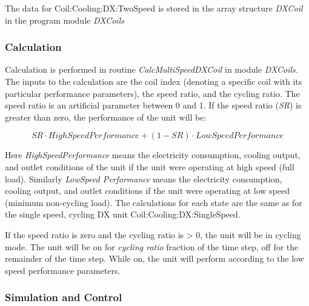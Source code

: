 The data for Coil:Cooling:DX:TwoSpeed is stored in the array structure \emph{DXCoil} in the program module \emph{DXCoils}

\subsubsection{Calculation}\label{calculation-000}

Calculation is performed in routine \emph{CalcMultiSpeedDXCoil} in module \emph{DXCoils}. The inputs to the calculation are the coil index (denoting a specific coil with its particular performance parameters), the speed ratio, and the cycling ratio. The speed ratio is an artificial parameter between 0 and 1. If the speed ratio (\emph{SR}) is greater than zero, the performance of the unit will be:

\begin{equation}
SR\cdot HighSpeedPerformance + (1 - SR)\cdot LowSpeedPerformance
\end{equation}

Here \emph{HighSpeedPerformance} means the electricity consumption, cooling output, and outlet conditions of the unit if the unit were operating at high speed (full load). Similarly \emph{LowSpeed Performance} means the electricity consumption, cooling output, and outlet conditions if the unit were operating at low speed (minimum non-cycling load). The calculations for each state are the same as for the single speed, cycling DX unit Coil:Cooling:DX:SingleSpeed.

If the speed ratio is zero and the cycling ratio is \textgreater{} 0, the unit will be in cycling mode. The unit will be on for \emph{cycling ratio} fraction of the time step, off for the remainder of the time step. While on, the unit will perform according to the low speed performance parameters.

\subsubsection{Simulation and Control}\label{simulation-and-control-001}

